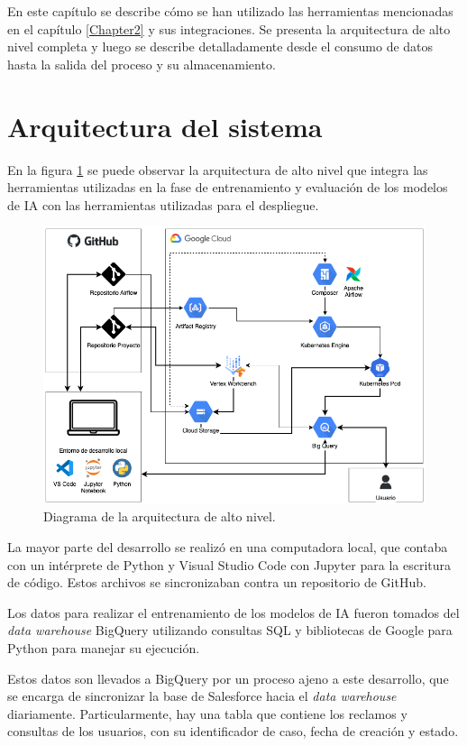 En este capítulo se describe cómo se han utilizado las herramientas mencionadas en el capítulo \ref{Chapter2} y sus integraciones. Se presenta la arquitectura de alto nivel completa y luego se describe detalladamente desde el consumo de datos hasta la salida del proceso y su almacenamiento.


\section{Arquitectura del sistema}

En la figura \ref{fig:arqsistema} se puede observar la arquitectura de alto nivel que integra las herramientas utilizadas en la fase de entrenamiento y evaluación de los modelos de IA con las herramientas utilizadas para el despliegue.

\begin{figure}[htbp]
	\centering
	\includegraphics[width=1\textwidth]{./Figures/arq-sistema.png}
	\caption{Diagrama de la arquitectura de alto nivel.}
	\label{fig:arqsistema}
\end{figure}

La mayor parte del desarrollo se realizó en una computadora local, que contaba con un intérprete de Python y Visual Studio Code con Jupyter para la escritura de código. Estos archivos se sincronizaban contra un repositorio de GitHub.

Los datos para realizar el entrenamiento de los modelos de IA fueron tomados del \textit{data warehouse} BigQuery utilizando consultas SQL y bibliotecas de Google para Python para manejar su ejecución.

Estos datos son llevados a BigQuery por un proceso ajeno a este desarrollo, que se encarga de sincronizar la base de Salesforce hacia el \textit{data warehouse} diariamente. Particularmente, hay una tabla que contiene los reclamos y consultas de los usuarios, con su identificador de caso, fecha de creación y estado.

